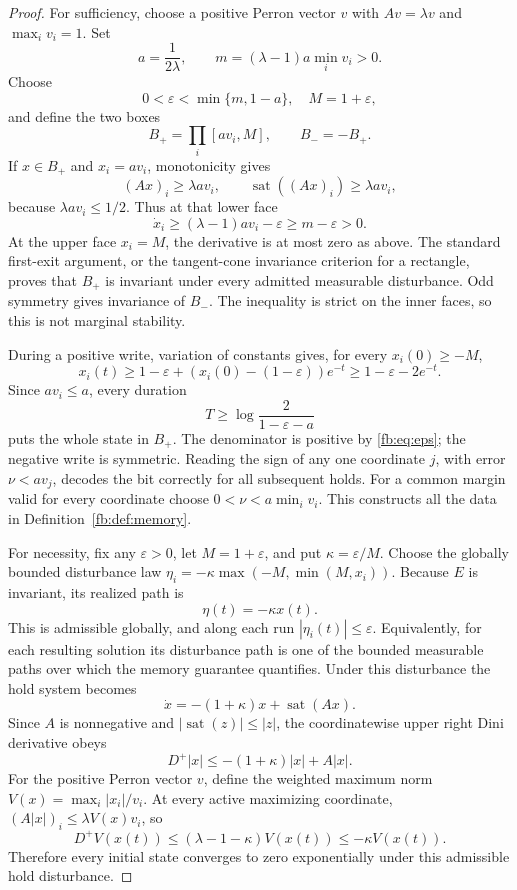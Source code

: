 \documentclass[11pt]{article}
\theoremstyle{definition}
\theoremstyle{remark}
\newcommand{\sat}{\operatorname{sat}}
\begin{document}
\begin{proof}
For sufficiency, choose a positive Perron vector $v$ with $Av=\lambda v$ and $\max_i v_i=1$. Set
\[
 a=\frac{1}{2\lambda},\qquad
 m=(\lambda-1)a\min_i v_i>0.
\]
Choose
\begin{equation}\label{fb:eq:eps}
 0<\varepsilon<\min\{m,1-a\},\quad M=1+\varepsilon,
\end{equation}
and define the two boxes
\[
 B_+=\prod_i[av_i,M],\qquad
 B_-=-B_+.
\]
If $x\in B_+$ and $x_i=av_i$, monotonicity gives
\[
 (Ax)_i\geq\lambda av_i,\qquad
 \sat((Ax)_i)\geq\lambda av_i,
\]
because $\lambda av_i\leq1/2$. Thus at that lower face
\[
 \dot x_i\geq(\lambda-1)av_i-\varepsilon\geq m-\varepsilon>0.
\]
At the upper face $x_i=M$, the derivative is at most zero as above. The standard first-exit argument, or the tangent-cone invariance criterion for a rectangle, proves that $B_+$ is invariant under every admitted measurable disturbance. Odd symmetry gives invariance of $B_-$. The inequality is strict on the inner faces, so this is not marginal stability.

During a positive write, variation of constants gives, for every $x_i(0)\geq-M$,
\[
 x_i(t)\geq1-\varepsilon+
   (x_i(0)-(1-\varepsilon))e^{-t}
 \geq1-\varepsilon-2e^{-t}.
\]
Since $av_i\leq a$, every duration
\begin{equation}\label{fb:eq:write-time}
 T\geq\log\frac{2}{1-\varepsilon-a}
\end{equation}
puts the whole state in $B_+$. The denominator is positive by \eqref{fb:eq:eps}; the negative write is symmetric. Reading the sign of any one coordinate $j$, with error $\nu<av_j$, decodes the bit correctly for all subsequent holds. For a common margin valid for every coordinate choose $0<\nu<a\min_i v_i$. This constructs all the data in Definition~\ref{fb:def:memory}.

For necessity, fix any $\varepsilon>0$, let $M=1+\varepsilon$, and put $\kappa=\varepsilon/M$. Choose the globally bounded disturbance law $\eta_i=-\kappa\max(-M,\min(M,x_i))$. Because $E$ is invariant, its realized path is
\[
 \eta(t)=-\kappa x(t).
\]
This is admissible globally, and along each run $|\eta_i(t)|\leq\varepsilon$. Equivalently, for each resulting solution its disturbance path is one of the bounded measurable paths over which the memory guarantee quantifies. Under this disturbance the hold system becomes
\[
 \dot x=-(1+\kappa)x+\sat(Ax).
\]
Since $A$ is nonnegative and $|\sat(z)|\leq|z|$, the coordinatewise upper right Dini derivative obeys
\[
 D^+|x|\leq-(1+\kappa)|x|+A|x|.
\]
For the positive Perron vector $v$, define the weighted maximum norm
$V(x)=\max_i|x_i|/v_i$. At every active maximizing coordinate,
$(A|x|)_i\leq\lambda V(x)v_i$, so
\[
 D^+V(x(t))\leq(\lambda-1-\kappa)V(x(t))
 \leq-\kappa V(x(t)).
\]
Therefore every initial state converges to zero exponentially under this admissible hold disturbance.


\end{proof}
\end{document}
